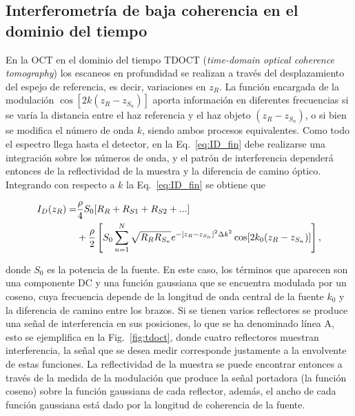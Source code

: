 \subsection{Interferometría de baja coherencia en el dominio del tiempo}



En la OCT en el dominio del tiempo TDOCT (\textit{time-domain optical coherence tomography}) los escaneos en profundidad se realizan a través del desplazamiento del espejo de referencia, es decir, variaciones en $z_R$. La función encargada de la modulación $\cos[2k(z_R - z_{S_n})]$ aporta información en diferentes frecuencias si se varía la distancia entre el haz referencia y el haz objeto $(z_R - z_{S_n})$, o si bien se modifica el número de onda $k$, siendo ambos procesos equivalentes. Como todo el espectro llega hasta el detector, en la Eq.~\ref{eq:ID_fin} debe realizarse una integración sobre los números de onda, y el patrón de interferencia dependerá entonces de la reflectividad de la muestra y la diferencia de camino óptico. Integrando con respecto a $k$ la Eq.~\ref{eq:ID_fin} se obtiene que

\begin{align}
I_D(z_R) = &\frac{\rho}{4}S_0 [R_R+ R_{S1}+ R_{S2}+...]\\ \notag
&+\frac{\rho}{2}\left[ S_0 \sum_{n=1}^{N} \sqrt{R_R R_{S_n}} e^{-[z_R-z_{S_n}]^2 \Delta k^2}  \cos[2k_0 (z_R-z_{S_n})]\right],
\end{align}

\noindent donde $S_0$ es la potencia de la fuente. En este caso, los términos que aparecen son una componente DC y una función gaussiana que se encuentra modulada por un coseno, cuya frecuencia depende de la longitud de onda central de la fuente $k_0$ y la diferencia de camino entre los brazos. Si se tienen varios reflectores se produce una señal de interferencia en sus posiciones, lo que se ha denominado línea A, esto se ejemplifica en la Fig.~\ref{fig:tdoct}, donde cuatro reflectores muestran interferencia, la señal que se desea medir corresponde justamente a la envolvente de estas funciones. La reflectividad de la muestra se puede encontrar entonces a través de la medida de la modulación que produce la señal portadora (la función coseno) sobre la función gaussiana de cada reflector, además, el ancho de cada función gaussiana está dado por la longitud de coherencia de la fuente.

